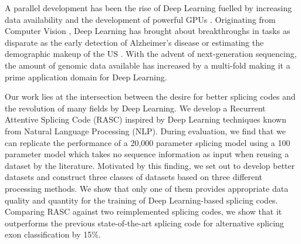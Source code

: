 A parallel development has been the rise of Deep Learning fuelled by increasing data availability and the development of powerful GPUs \cite{deeplearning}. 
Originating from Computer Vision \cite{alexnet}, Deep Learning has brought about breakthroughs in tasks as disparate as the early detection of Alzheimer's disease \cite{alzheimerdeeplearning} or estimating the demographic makeup of the US \cite{demographic}. 
With the advent of next-generation sequencing, the amount of genomic data available has increased by a multi-fold making it a prime application domain for Deep Learning. 



Our work lies at the intersection between the desire for better splicing codes and the revolution of many fields by Deep Learning. We develop a Recurrent Attentive Splicing Code (RASC) inspired by Deep Learning techniques known from Natural Language Processing (NLP). During evaluation, we find that we can replicate the performance of a 20,000 parameter splicing model using a 100 parameter model which takes no sequence information as input when reusing a dataset by the literature. Motivated by this finding, we set out to develop better datasets and construct three classes of datasets based on three different processing methods. We show that only one of them provides appropriate data quality and quantity for the training of Deep Learning-based splicing codes. Comparing RASC against two reimplemented splicing codes, we show that it outperforms the previous state-of-the-art splicing code for alternative splicing exon classification by 15\%. 




